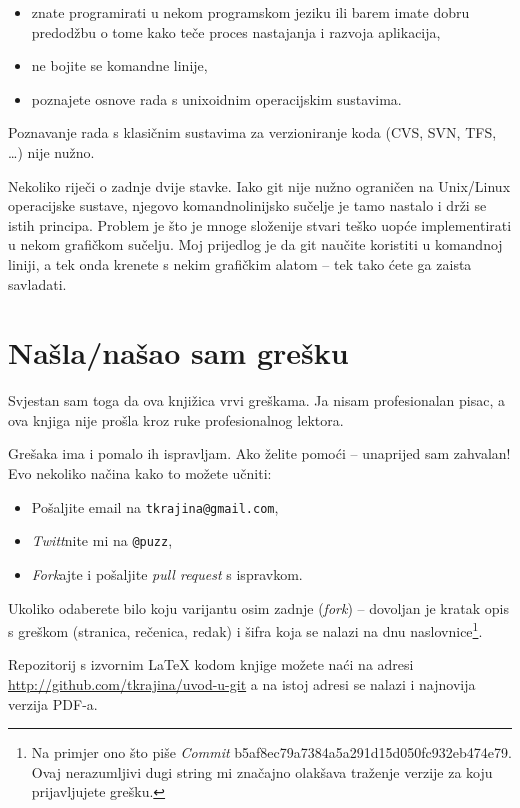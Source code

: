 \begin{itemize}
	\item znate programirati u nekom programskom jeziku ili barem imate dobru predodžbu o tome kako teče proces nastajanja i razvoja aplikacija,
	\item ne bojite se komandne linije,
	\item poznajete osnove rada s unixoidnim operacijskim sustavima.
\end{itemize}

Poznavanje rada s klasičnim sustavima za verzioniranje koda (CVS, SVN, TFS, \dots) nije nužno.

Nekoliko riječi o zadnje dvije stavke.
Iako git nije nužno ograničen na Unix/Linux operacijske sustave, njegovo komandnolinijsko sučelje je tamo nastalo i drži se istih principa.
Problem je što je mnoge složenije stvari teško uopće implementirati u nekom grafičkom sučelju. 
Moj prijedlog je da git naučite koristiti u komandnoj liniji, a tek onda krenete s nekim grafičkim alatom -- tek tako ćete ga zaista savladati.

\section*{Našla/našao sam grešku}

Svjestan sam toga da ova knjižica vrvi greškama.
Ja nisam profesionalan pisac, a ova knjiga nije prošla kroz ruke profesionalnog lektora.

Grešaka ima i pomalo ih ispravljam.
Ako želite pomoći -- unaprijed sam zahvalan!
Evo nekoliko načina kako to možete učniti:

\begin{itemize}
    \item Pošaljite email na \verb+tkrajina@gmail.com+,
    \item \emph{Twitt}nite mi na \verb+@puzz+,
    \item \emph{Fork}ajte i pošaljite \emph{pull request} s ispravkom. 
\end{itemize}

Ukoliko odaberete bilo koju varijantu osim zadnje (\emph{fork}) -- dovoljan je kratak opis s greškom (stranica, rečenica, redak) i šifra koja se nalazi na dnu naslovnice\footnote{Na primjer ono što piše \emph{Commit} b5af8ec79a7384a5a291d15d050fc932eb474e79. Ovaj nerazumljivi dugi string mi značajno olakšava traženje verzije za koju prijavljujete grešku.}.

Repozitorij s izvornim \LaTeX{} kodom knjige možete naći na adresi \\\url{http://github.com/tkrajina/uvod-u-git}
 a na istoj adresi se nalazi i najnovija verzija PDF-a.

